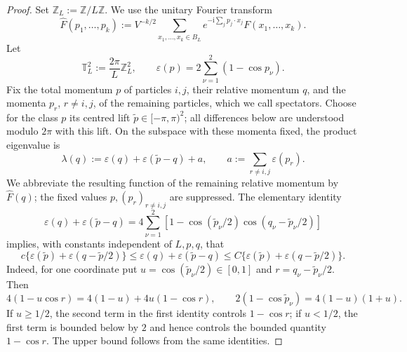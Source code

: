 \documentclass[10pt,a4paper]{amsart}
\begin{document}
\begin{proof}
Set \(\mathbb Z_L:=\mathbb Z/L\mathbb Z\).  We use the unitary Fourier
transform
\[
 \widehat F(p_1,\ldots,p_k)
 :=V^{-k/2}\sum_{x_1,\ldots,x_k\in B_L}
 e^{-\mathrm i\sum_jp_j\cdot x_j}F(x_1,\ldots,x_k).
\]
Let
\[
 \mathbb T_L^2:=\frac{2\pi}{L}\mathbb Z_L^2,
 \qquad
 \varepsilon(p)=2\sum_{\nu=1}^2(1-\cos p_\nu).
\]
Fix the total momentum \(p\) of particles \(i,j\), their relative momentum
\(q\), and the momenta \(p_r\), \(r\ne i,j\), of the remaining particles,
which we call spectators.  Choose for the
class \(p\) its centred lift \(\widetilde p\in[-\pi,\pi)^2\); all
differences below are understood modulo \(2\pi\) with this lift.  On the
subspace with these momenta fixed, the product eigenvalue is
\begin{equation}
 \lambda(q):=\varepsilon(q)+\varepsilon(\widetilde p-q)+a,
 \qquad a:=\sum_{r\ne i,j}\varepsilon(p_r).
 \label{eq:product-fibre-energy}
\end{equation}
We abbreviate the resulting function of the remaining relative momentum
by \(\widehat F(q)\); the fixed values \(p,(p_r)_{r\ne i,j}\) are
suppressed.
The elementary identity
\[
 \varepsilon(q)+\varepsilon(\widetilde p-q)
 =4\sum_{\nu=1}^2
 \left[1-\cos(\widetilde p_\nu/2)
 \cos(q_\nu-\widetilde p_\nu/2)\right]
\]
implies, with constants independent of \(L,p,q\), that
\begin{equation}
 c\bigl\{\varepsilon(\widetilde p)
       +\varepsilon(q-\widetilde p/2)\bigr\}
 \leq \varepsilon(q)+\varepsilon(\widetilde p-q)
 \leq C\bigl\{\varepsilon(\widetilde p)
       +\varepsilon(q-\widetilde p/2)\bigr\}.
 \label{eq:pair-dispersion-comparison}
\end{equation}
Indeed, for one coordinate put
\(u=\cos(\widetilde p_\nu/2)\in[0,1]\) and
\(r=q_\nu-\widetilde p_\nu/2\).  Then
\[
 4(1-u\cos r)=4(1-u)+4u(1-\cos r),
 \qquad
 2(1-\cos\widetilde p_\nu)=4(1-u)(1+u).
\]
If \(u\geq1/2\), the second term in the first identity controls
\(1-\cos r\); if \(u<1/2\), the first term is bounded below by \(2\)
and hence controls the bounded quantity \(1-\cos r\).  The upper bound
follows from the same identities.


\end{proof}
\end{document}
